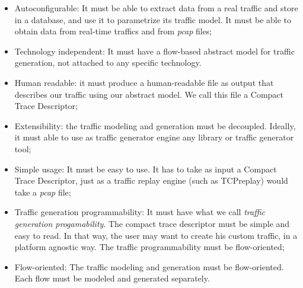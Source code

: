 \begin{itemize}
	
	\item Autoconfigurable: It must be able to extract data from a real traffic and store in a database, and use it to parametrize its traffic model. It must be able to obtain data from real-time traffics and from \textit{pcap} files;
	
	\item Technology independent: It must have a flow-based abstract model for traffic generation, not attached to any specific technology.
	
	\item Human readable: it must produce a human-readable file as output that describes our traffic using our abstract model. We call this file a Compact Trace Descriptor;
	
	\item Extensibility: the traffic modeling and generation must be decoupled. Ideally, it must able to use as traffic generator engine any library or traffic generator tool;
	
	\item Simple usage: It must be easy to use. It has to take as input a Compact Trace Descriptor, just as a traffic replay engine (such as TCPreplay) would take a \textit{pcap} file;
	
	\item Traffic generation programmability: It must have what we call \textit{traffic generation progamability}. The compact trace descriptor must be simple and easy to read. In that way, the user may want to create his custom traffic, in a platform agnostic way. The traffic programmability must be flow-oriented;
	
	\item Flow-oriented: The traffic modeling and generation must be flow-oriented. Each flow must be modeled and generated separately.
	
\end{itemize}








